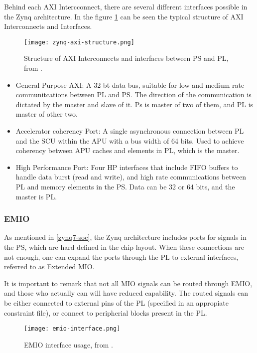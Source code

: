 Behind each AXI Intercconnect, there are several different interfaces possible in the Zynq architecture. In the figure \ref{fig:zynq-axi-structure} can be seen the typical structure of AXI Interconnects and Interfaces.

\begin{figure}[htp]
	\centering
	\texttt{[image: zynq-axi-structure.png]}
	\caption{Structure of AXI Interconnects and interfaces between PS and PL, from \cite{Crokett2014}.} \label{fig:zynq-axi-structure}
\end{figure}

\begin{itemize}
	\item General Purpose AXI: A 32-bt data bus, suitable for low and medium rate communitcations between PL and PS. The direction of the communication is dictated by the master and slave of it. Ps is master of two of them, and PL is master of other two.
	\item Accelerator coherency Port: A single asynchronous connection between PL and the SCU within the APU with a bus width of 64 bits. Used to achieve coherency between APU caches and elements in PL, which is the master.
	\item High Performance Port: Four HP interfaces that include FIFO buffers to handle data burst (read and write), and high rate communications between PL and memory elements in the PS. Data can be 32 or 64 bits, and the master is PL.
\end{itemize}

\subsubsection*{EMIO}

As mentioned in \ref{zynq7-soc}, the Zynq architecture includes ports for signals in the PS, which are hard defined in the chip layout. When these connections are not enough, one can expand the ports through the PL to external interfaces, referred to as Extended MIO.

It is important to remark that not all MIO signals can be routed through EMIO, and those who actually can will have reduced capability. The routed signals can be either connected to external pins of the PL (specified in an appropiate constraint file), or connect to peripherial blocks present in the PL.

\begin{figure}[htp]
	\centering
	\texttt{[image: emio-interface.png]}
	\caption{EMIO interface usage, from \cite{Crokett2014}.} \label{fig:emio-interface}
\end{figure}
